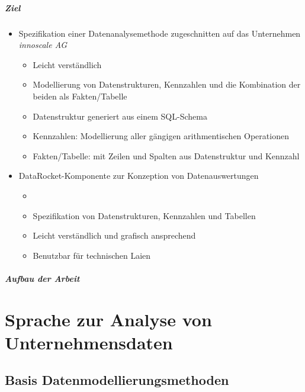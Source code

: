 \documentclass[
  language=german, %
  type=bachelor%
]{isthesis}
\begin{document}
\begin{content}
  \paragraph{Ziel}
  \begin{itemize}
    \item Spezifikation einer Datenanalysemethode zugeschnitten auf das
      Unternehmen \textit{innoscale AG}
      \begin{itemize}
        \item Leicht verständlich
        \item Modellierung von Datenstrukturen, Kennzahlen und die Kombination der
          beiden als Fakten/Tabelle
        \item Datenstruktur generiert aus einem SQL-Schema
        \item Kennzahlen: Modellierung aller gängigen arithmentischen Operationen
        \item Fakten/Tabelle: mit Zeilen und Spalten aus Datenstruktur und Kennzahl 
      \end{itemize}
    \item DataRocket-Komponente zur Konzeption von Datenauswertungen
      \begin{itemize}
        \item {}
        \item Spezifikation von Datenstrukturen, Kennzahlen und Tabellen
        \item Leicht verständlich und grafisch ansprechend
        \item Benutzbar für technischen Laien
      \end{itemize}
  \end{itemize}

  \paragraph{Aufbau der Arbeit}




  \chapter{Sprache zur Analyse von Unternehmensdaten}

  \section{Basis Datenmodellierungsmethoden}


\end{content}
\end{document}
